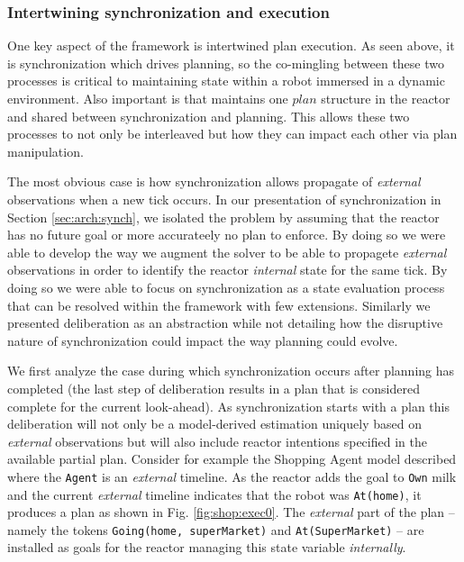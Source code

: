 \subsubsection{Intertwining synchronization and execution}
\label{sec:arch:intertwine}

One key aspect of the \rx framework is intertwined plan execution. As
seen above, it is synchronization which drives planning, so the
co-mingling between these two processes is critical to maintaining
state within a robot immersed in a dynamic environment. Also important
is that \rx maintains 
one $plan$ structure in the reactor and shared between synchronization
and planning. This allows these two processes to not only be
interleaved but how they can impact each other via plan manipulation.

The most obvious case is how synchronization allows propagate of {\em
  external} observations when a new tick occurs. In our presentation
of synchronization in Section \ref{sec:arch:synch}, we isolated the
problem by assuming that the reactor has no future goal or more
accurateely no plan to enforce.  By doing so we were able to develop
the way we augment the \eu solver to be able to propagete {\em
  external} observations in order to identify the reactor {\em
  internal} state for the same tick. By doing so we were able to focus
on synchronization as a state evaluation process that can be resolved
within the \eu framework with few extensions. Similarly we presented
deliberation as an abstraction while not detailing how the disruptive
nature of synchronization could impact the way planning could evolve.

We first analyze the case during which synchronization occurs after
planning has completed (\ie the last step of deliberation results in a
plan that is considered complete for the current look-ahead). As
synchronization starts with a plan %
this deliberation will not only be a model-derived estimation uniquely
based on {\em external} observations but will also include reactor
intentions specified in the available partial plan. Consider for
example the Shopping Agent model described where the \texttt{Agent} is
an {\em external} timeline. As the reactor adds the goal to
\texttt{Own} milk and the current {\em external} timeline indicates
that the robot was \texttt{At(home)}, it produces a plan as shown in
Fig. \ref{fig:shop:exec0}. The {\em external} part of the plan --
namely the tokens \texttt{Going(home, superMarket)} and
\texttt{At(SuperMarket)} -- are installed as goals for the reactor
managing this state variable {\em internally}.

